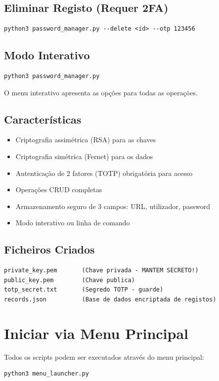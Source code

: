 \documentclass[11pt,a4paper]{article}
\begin{document}
\subsection{Eliminar Registo (Requer 2FA)}
\begin{lstlisting}[style=bash]
python3 password_manager.py --delete <id> --otp 123456
\end{lstlisting}

\subsection{Modo Interativo}
\begin{lstlisting}[style=bash]
python3 password_manager.py
\end{lstlisting}

O menu interativo apresenta as op\c{c}\~oes para todas as opera\c{c}\~oes.

\subsection{Caracter\'isticas}
\begin{itemize}
  \item Criptografia assim\'etrica (RSA) para as chaves
  \item Criptografia sim\'etrica (Fernet) para os dados
  \item Autentica\c{c}\~ao de 2 fatores (TOTP) obrigat\'oria para acesso
  \item Opera\c{c}\~oes CRUD completas
  \item Armazenamento seguro de 3 campos: URL, utilizador, password
  \item Modo interativo ou linha de comando
\end{itemize}

\subsection{Ficheiros Criados}
\begin{lstlisting}[style=bash]
private_key.pem       (Chave privada - MANTEM SECRETO!)
public_key.pem        (Chave publica)
totp_secret.txt       (Segredo TOTP - guarde)
records.json          (Base de dados encriptada de registos)
\end{lstlisting}

\section{Iniciar via Menu Principal}
Todos os scripts podem ser executados atrav\'es do menu principal:
\begin{lstlisting}[style=bash]
python3 menu_launcher.py
\end{lstlisting}
\end{document}
